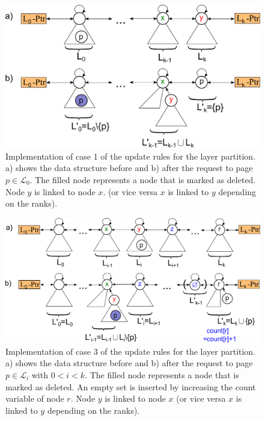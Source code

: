 \documentclass[a4paper,12pt, titlepage]{article}  %
\newcommand{\cl}{\mathcal{L}}   %
\begin{document}
\begin{figure}[htp]   
	\centering
	\includegraphics[scale=0.5]{./figures/LTrees_case1.pdf}
	\caption{Implementation of case 1 of the update rules for the layer partition. 
	         a) shows the data structure before and b) after the request to page $p \in \cl_0$.
	         The filled node represents a node that is marked as deleted. Node $y$ is linked to node $x$.
	         (or vice versa $x$ is linked to $y$ depending on the ranks).}
	\label{fig:LTrees_case1}
\end{figure}

\begin{figure}[htp]
	\centering
	\includegraphics[scale=0.5]{./figures/LTrees_case3.pdf}
	\caption{Implementation of case 3 of the update rules for the layer partition. 
	         a) shows the data structure before and b) after the request to page $p \in \cl_i$
	         with $0<i<k$.
	         The filled node represents a node that is marked as deleted.
	         An empty set is inserted by increasing the count variable of node $r$.
                 Node $y$ is linked to node $x$ 
	         (or vice versa $x$ is linked to $y$ depending on the ranks).} 
	\label{fig:LTrees_case3}
\end{figure}
\end{document}
